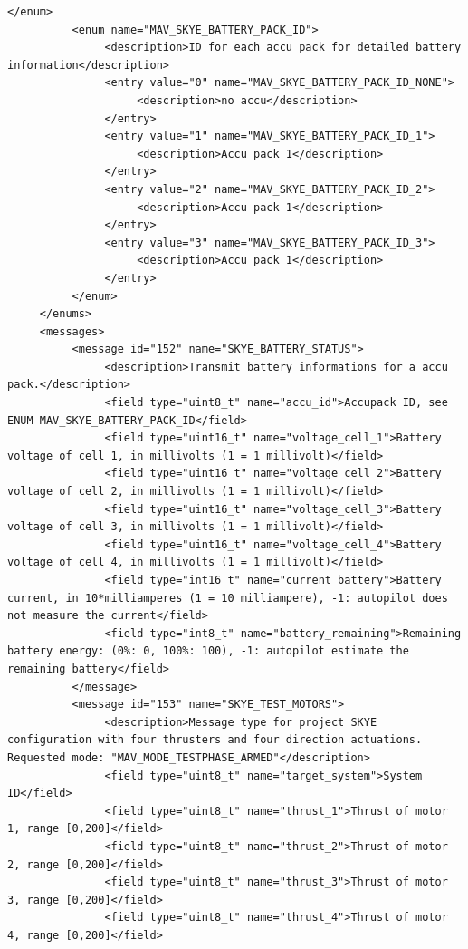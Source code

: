 \begin{lstlisting}[captionpos=b, caption="Definition of \textsc{Skye} specific Mavlink messages", label=app_xml]
          </enum>
          <enum name="MAV_SKYE_BATTERY_PACK_ID">
               <description>ID for each accu pack for detailed battery information</description>
               <entry value="0" name="MAV_SKYE_BATTERY_PACK_ID_NONE">
                    <description>no accu</description>
               </entry>
               <entry value="1" name="MAV_SKYE_BATTERY_PACK_ID_1">
                    <description>Accu pack 1</description>
               </entry>
               <entry value="2" name="MAV_SKYE_BATTERY_PACK_ID_2">
                    <description>Accu pack 1</description>
               </entry>
               <entry value="3" name="MAV_SKYE_BATTERY_PACK_ID_3">
                    <description>Accu pack 1</description>
               </entry>
          </enum>
     </enums>
     <messages>
          <message id="152" name="SKYE_BATTERY_STATUS">
               <description>Transmit battery informations for a accu pack.</description>
               <field type="uint8_t" name="accu_id">Accupack ID, see ENUM MAV_SKYE_BATTERY_PACK_ID</field>
               <field type="uint16_t" name="voltage_cell_1">Battery voltage of cell 1, in millivolts (1 = 1 millivolt)</field>
               <field type="uint16_t" name="voltage_cell_2">Battery voltage of cell 2, in millivolts (1 = 1 millivolt)</field>
               <field type="uint16_t" name="voltage_cell_3">Battery voltage of cell 3, in millivolts (1 = 1 millivolt)</field>
               <field type="uint16_t" name="voltage_cell_4">Battery voltage of cell 4, in millivolts (1 = 1 millivolt)</field>
               <field type="int16_t" name="current_battery">Battery current, in 10*milliamperes (1 = 10 milliampere), -1: autopilot does not measure the current</field>
               <field type="int8_t" name="battery_remaining">Remaining battery energy: (0%: 0, 100%: 100), -1: autopilot estimate the remaining battery</field>
          </message>
          <message id="153" name="SKYE_TEST_MOTORS">
               <description>Message type for project SKYE configuration with four thrusters and four direction actuations. Requested mode: "MAV_MODE_TESTPHASE_ARMED"</description>
               <field type="uint8_t" name="target_system">System ID</field>
               <field type="uint8_t" name="thrust_1">Thrust of motor 1, range [0,200]</field>
               <field type="uint8_t" name="thrust_2">Thrust of motor 2, range [0,200]</field>
               <field type="uint8_t" name="thrust_3">Thrust of motor 3, range [0,200]</field>
               <field type="uint8_t" name="thrust_4">Thrust of motor 4, range [0,200]</field>

\end{lstlisting}
